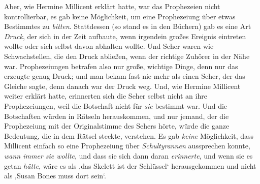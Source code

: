 Aber, wie Hermine Millicent erklärt hatte, war das Prophezeien nicht kontrollierbar, es gab keine Möglichkeit, um eine Prophezeiung über etwas Bestimmtes zu \emph{bitten}. Stattdessen (so stand es in den Büchern) gab es eine Art \emph{Druck}, der sich in der Zeit aufbaute, wenn irgendein großes Ereignis eintreten wollte oder sich selbst davon abhalten wollte. Und Seher waren wie Schwachstellen, die den Druck abließen, wenn der richtige Zuhörer in der Nähe war. Prophezeiungen betrafen also nur große, wichtige Dinge, denn nur das erzeugte genug Druck; und man bekam fast nie mehr als einen Seher, der das Gleiche sagte, denn danach war der Druck weg. Und, wie Hermine Millicent weiter erklärt hatte, erinnerten sich die Seher selbst nicht an ihre Prophezeiungen, weil die Botschaft nicht für \emph{sie} bestimmt war. Und die Botschaften würden in Rätseln herauskommen, und nur jemand, der die Prophezeiung mit der Originalstimme des Sehers hörte, würde die ganze Bedeutung, die in dem Rätsel steckte, verstehen. Es gab \emph{keine} Möglichkeit, dass Millicent einfach so eine Prophezeiung über \emph{Schultyrannen} aussprechen konnte, \emph{wann immer sie wollte}, und dass sie sich dann daran \emph{erinnerte}, und wenn sie es getan \emph{hätte}, wäre es als ‚das Skelett ist der Schlüssel‘ herausgekommen und nicht als ‚Susan Bones muss dort sein‘.

